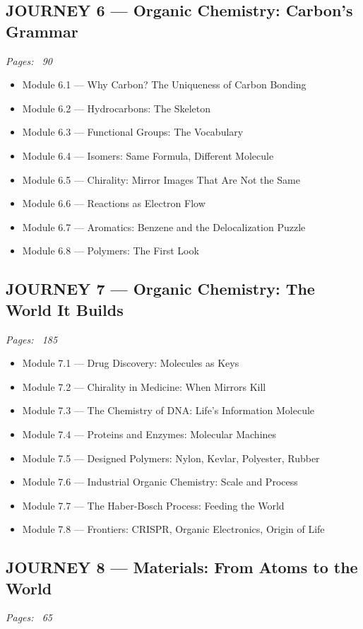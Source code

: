 \documentclass{article}
\begin{document}
\subsection*{JOURNEY 6 — Organic Chemistry: Carbon's Grammar}
\textit{Pages: ~90}

\begin{itemize}
    \item Module 6.1 — Why Carbon? The Uniqueness of Carbon Bonding
    \item Module 6.2 — Hydrocarbons: The Skeleton
    \item Module 6.3 — Functional Groups: The Vocabulary
    \item Module 6.4 — Isomers: Same Formula, Different Molecule
    \item Module 6.5 — Chirality: Mirror Images That Are Not the Same
    \item Module 6.6 — Reactions as Electron Flow
    \item Module 6.7 — Aromatics: Benzene and the Delocalization Puzzle
    \item Module 6.8 — Polymers: The First Look
\end{itemize}

\subsection*{JOURNEY 7 — Organic Chemistry: The World It Builds}
\textit{Pages: ~185}

\begin{itemize}
    \item Module 7.1 — Drug Discovery: Molecules as Keys
    \item Module 7.2 — Chirality in Medicine: When Mirrors Kill
    \item Module 7.3 — The Chemistry of DNA: Life's Information Molecule
    \item Module 7.4 — Proteins and Enzymes: Molecular Machines
    \item Module 7.5 — Designed Polymers: Nylon, Kevlar, Polyester, Rubber
    \item Module 7.6 — Industrial Organic Chemistry: Scale and Process
    \item Module 7.7 — The Haber-Bosch Process: Feeding the World
    \item Module 7.8 — Frontiers: CRISPR, Organic Electronics, Origin of Life
\end{itemize}

\subsection*{JOURNEY 8 — Materials: From Atoms to the World}
\textit{Pages: ~65}
\end{document}
